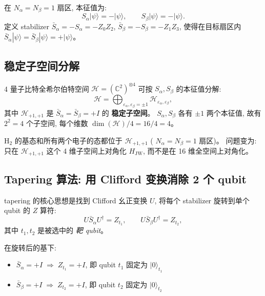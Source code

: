 \documentclass[fontset=mac]{ctexart}
\newcommand{\Zop}{Z}
\newcommand{\ket}[1]{|#1\rangle}
\newcommand{\HS}{\mathcal{H}}
\begin{document}
在 $N_\alpha = N_\beta = 1$ 扇区, 本征值为:
\begin{equation}
    S_\alpha \ket{\psi} = -\ket{\psi}, \qquad
    S_\beta \ket{\psi} = -\ket{\psi}.
\end{equation}
定义 stabilizer $\bar{S}_\alpha = -S_\alpha = -\Zop_0\Zop_2$,
$\bar{S}_\beta = -S_\beta = -\Zop_1\Zop_3$,
使得在目标扇区内 $\bar{S}_\alpha\ket{\psi} = \bar{S}_\beta\ket{\psi} = +\ket{\psi}$。

\subsection*{稳定子空间分解}

4 量子比特全希尔伯特空间 $\HS = (\mathbb{C}^2)^{\otimes 4}$ 可按 $S_\alpha, S_\beta$ 的本征值分解:
\begin{equation}
    \HS = \bigoplus_{\varepsilon_\alpha, \varepsilon_\beta = \pm 1}
          \HS_{\varepsilon_\alpha, \varepsilon_\beta},
\end{equation}
其中 $\HS_{+1, +1}$ 是 $\bar{S}_\alpha = \bar{S}_\beta = +I$ 的 \textbf{稳定子空间}。
$S_\alpha, S_\beta$ 各有 $\pm 1$ 两个本征值, 故有 $2^2 = 4$ 个子空间,
每个维数 $\dim(\HS) / 4 = 16/4 = 4$。

H$_2$ 的基态和所有两个电子的态都位于 $\HS_{+1,+1}$ ( $N_\alpha = N_\beta = 1$ 扇区)。
问题变为: 只在 $\HS_{+1,+1}$ 这个 4 维子空间上对角化 $H_{\text{JW}}$,
而不是在 16 维全空间上对角化。

\subsection*{Tapering 算法: 用 Clifford 变换消除 2 个 qubit}

tapering 的核心思想是找到 Clifford 幺正变换 $U$, 将每个 stabilizer 旋转到单个 qubit 的 $Z$ 算符:
\begin{equation}
    U \bar{S}_\alpha U^\dagger = \Zop_{t_1}, \qquad
    U \bar{S}_\beta  U^\dagger = \Zop_{t_2},
\end{equation}
其中 $t_1, t_2$ 是被选中的 \emph{靶 qubit}。

在旋转后的基下:
\begin{itemize}
    \item $\bar{S}_\alpha = +I \;\Longrightarrow\; \Zop_{t_1} = +I$, 即 qubit $t_1$ 固定为 $\ket{0}_{t_1}$
    \item $\bar{S}_\beta  = +I \;\Longrightarrow\; \Zop_{t_2} = +I$, 即 qubit $t_2$ 固定为 $\ket{0}_{t_2}$
\end{itemize}
\end{document}
